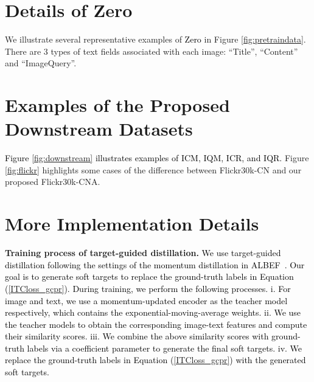 \documentclass[sigconf]{acmart}
\def\mmcr{\textcolor{black}}
\begin{document}
\newpage
\appendix


\setcounter{equation}{0}
\setcounter{table}{0}
\setcounter{figure}{0}





\newpage
\section{Details of Zero}
\label{details-pretrain}
We illustrate several representative examples of \mmcr{Zero} in Figure \ref{fig:pretraindata}. 
There are 3 types of text fields associated with each image: ``Title'', ``Content'' and ``ImageQuery''. 





\section{Examples of the Proposed Downstream Datasets}
\label{details-downstream}
\mmcr{Figure \ref{fig:downstream} illustrates examples of ICM, IQM, ICR, and IQR.}
Figure \ref{fig:flickr} highlights some cases of the difference between Flickr30k-CN and our proposed Flickr30k-CNA.





\section{More Implementation Details}
\label{details-finetune}
\textbf{Training process of target-guided distillation.}
\mmcr{
We use target-guided distillation following the settings of the momentum distillation in ALBEF~\cite{ALBEF}. Our goal is to generate soft targets to replace the ground-truth labels in Equation (\ref{ITCloss_gcpr}). During training, we perform the following processes.
i. For image and text, we use a momentum-updated encoder as the teacher model respectively, which contains the exponential-moving-average weights.
ii. We use the teacher models to obtain the corresponding image-text features and compute their similarity scores.
iii. We combine the above similarity scores with ground-truth labels via a coefficient parameter to generate the final soft targets.
iv. We replace the ground-truth labels in Equation (\ref{ITCloss_gcpr}) with the generated soft targets.
}
\end{document}

